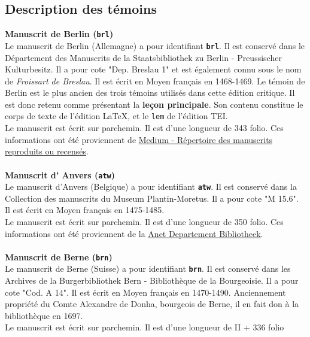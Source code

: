 \documentclass[12pt, a4paper]{article}
\begin{document}
                \subsection{Description des témoins}
                \noindent \textbf{Manuscrit de Berlin (\texttt{brl})}\\
            
         \indent Le manuscrit de Berlin (Allemagne) a pour identifiant \textbf{\texttt{brl}}. Il est conservé dans le Département des Manuscrits de la  Staatsbibliothek zu Berlin - Preussischer Kulturbesitz. Il a pour cote "Dep. Breslau 1" et est également connu sous le nom de \textit{Froissart de Breslau}. Il est écrit en Moyen français en 1468-1469. Le témoin de Berlin est le plus ancien des trois témoins utilisés dans cette édition critique. Il est donc retenu comme présentant la \textbf{leçon principale}.
                Son contenu constitue le corps de texte de l'édition \LaTeX, et
                le \texttt{lem} de l'édition TEI.\\ \indent Le manuscrit est écrit sur parchemin. Il est d'une longueur de 343 folio. Ces informations ont été proviennent de \href{http://medium-avance.irht.cnrs.fr/ark:/63955/md44pk02gf53}{Medium - Répertoire des manuscrits reproduits ou recensés}.\\~\\\noindent \textbf{Manuscrit d' Anvers (\texttt{atw})}\\
            
         \indent Le manuscrit d'Anvers (Belgique) a pour identifiant \textbf{\texttt{atw}}. Il est conservé dans la Collection des manuscrits du  Museum Plantin-Moretus. Il a pour cote "M 15.6". Il est écrit en Moyen français en 1475-1485.\\ \indent Le manuscrit est écrit sur parchemin. Il est d'une longueur de 350 folio. Ces informations ont été proviennent de la \href{https://anet.be/record/opacmpm/c:lvd:14057240/F}{Anet Departement Bibliotheek}.\\~\\\noindent \textbf{Manuscrit de Berne (\texttt{brn})}\\
            
         \indent Le manuscrit de Berne (Suisse) a pour identifiant \textbf{\texttt{brn}}. Il est conservé dans les Archives de la  Burgerbibliothek Bern - Bibliothèque de la Bourgeoisie. Il a pour cote "Cod. A 14". Il est écrit en Moyen français en 1470-1490. Anciennement propriété du Comte Alexandre de Donha, bourgeois de Berne, il en fait don à la bibliothèque en 1697.\\ \indent Le manuscrit est écrit sur parchemin. Il est d'une longueur de II + 336 folio
                      
\end{document}
